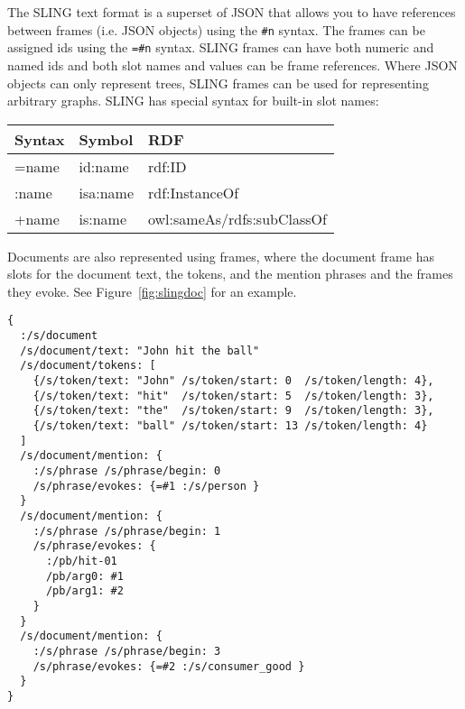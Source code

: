 \documentclass[11pt,a4paper]{article}
\begin{document}
The SLING text format is a superset of JSON that allows you to have references
between frames (i.e. JSON objects) using the {\tt \#n} syntax. The frames can be
assigned ids using the {\tt=\#n} syntax. SLING frames can have both numeric and
named ids and both slot names and values can be frame references. Where JSON
objects can only represent trees, SLING frames can be used for representing
arbitrary graphs. SLING has special syntax for built-in slot names:

\begin{table}[h!]
\begin{tabular}{|l|l|l|}
\hline
Syntax & Symbol & RDF \\
\hline
=name & id:name & rdf:ID \\
:name & isa:name & rdf:InstanceOf \\
+name & is:name & owl:sameAs/rdfs:subClassOf \\
\hline
\end{tabular}
\end{table}

Documents are also represented using frames, where the document frame has slots
for the document text, the tokens, and the mention phrases and the frames they
evoke. See Figure~\ref{fig:slingdoc} for an example.

\begin{figure*}[t]
  \begin{verbatim}
{
  :/s/document
  /s/document/text: "John hit the ball"
  /s/document/tokens: [
    {/s/token/text: "John" /s/token/start: 0  /s/token/length: 4},
    {/s/token/text: "hit"  /s/token/start: 5  /s/token/length: 3},
    {/s/token/text: "the"  /s/token/start: 9  /s/token/length: 3},
    {/s/token/text: "ball" /s/token/start: 13 /s/token/length: 4}
  ]
  /s/document/mention: {
    :/s/phrase /s/phrase/begin: 0
    /s/phrase/evokes: {=#1 :/s/person }
  }
  /s/document/mention: {
    :/s/phrase /s/phrase/begin: 1
    /s/phrase/evokes: {
      :/pb/hit-01
      /pb/arg0: #1
      /pb/arg1: #2
    }
  }
  /s/document/mention: {
    :/s/phrase /s/phrase/begin: 3
    /s/phrase/evokes: {=#2 :/s/consumer_good }
  }
}
\end{verbatim}
  \caption{The text "John hit the ball" in SLING frame notation. The document
  itself is represented by a frame that has the text, an array of tokens and
  the mentions that evoke frames. There are three frames: a person frame (John),
  a consumer good frame (bat) and a hit-01 frame. The hit frame has the person
  frame as the agent (arg0) and the ball frame as the object (arg1).}
  \label{fig:slingdoc}
\end{figure*}
\end{document}
